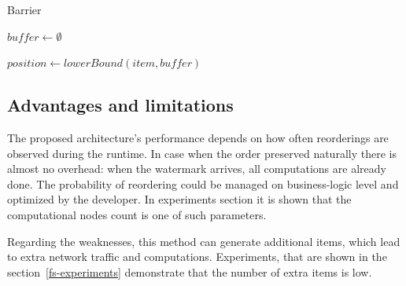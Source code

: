 \begin{algorithm}
\caption{Barrier}
\label{barrier-insert}
  \begin{algorithmic}[1]
    \State $buffer \gets \emptyset$

    \State

      \State $position \gets lowerBound(item, buffer)$
        \State {}
      \Else
        \State {}
      \EndIf
    \EndFunction

    \State

        \State {}
        \State {}
      \EndFor
    \EndFunction
  \end{algorithmic}
\end{algorithm}

\subsection{Advantages and limitations}
The proposed architecture's performance depends on how often reorderings are observed during the runtime. In case when the order preserved naturally there is almost no overhead: when the watermark arrives, all computations are already done. The probability of reordering could be managed on business-logic level and optimized by the developer. In experiments section it is shown that the computational nodes count is one of such parameters.

Regarding the weaknesses, this method can generate additional items, which lead to extra network traffic and computations. Experiments, that are shown in the section~\ref{fs-experiments} demonstrate that the number of extra items is low.
